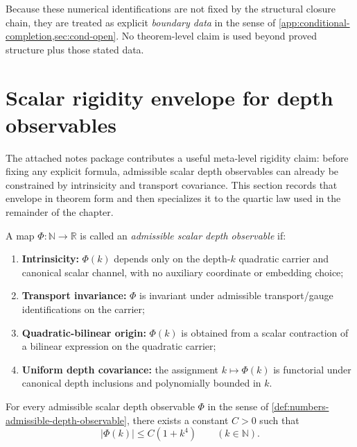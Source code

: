 Because these numerical identifications are not fixed by the structural
closure chain, they are treated as explicit \emph{boundary data} in the
sense of \cref{app:conditional-completion,sec:cond-open}.
No theorem-level claim is used beyond proved structure plus those stated
data.

\section{Scalar rigidity envelope for depth observables}
\label{sec:numbers-rigidity-envelope}

The attached notes package contributes a useful meta-level rigidity claim:
before fixing any explicit formula, admissible scalar depth observables
can already be constrained by intrinsicity and transport covariance.
This section records that envelope in theorem form and then specializes
it to the quartic law used in the remainder of the chapter.

\begin{definition}
\label{def:numbers-admissible-depth-observable}
A map \(\Phi:\mathbb N\to\mathbb R\) is called an
\emph{admissible scalar depth observable} if:
\begin{enumerate}[label=\textup{(\roman*)}]
\item
      \textbf{Intrinsicity:} \(\Phi(k)\) depends only on the depth-\(k\)
      quadratic carrier and canonical scalar channel, with no auxiliary
      coordinate or embedding choice;
\item
      \textbf{Transport invariance:} \(\Phi\) is invariant under admissible
      transport/gauge identifications on the carrier;
\item
      \textbf{Quadratic-bilinear origin:} \(\Phi(k)\) is obtained from a
      scalar contraction of a bilinear expression on the quadratic carrier;
\item
      \textbf{Uniform depth covariance:} the assignment
      \(k\mapsto\Phi(k)\) is functorial under canonical depth inclusions and
      polynomially bounded in \(k\).
\end{enumerate}
\end{definition}

\begin{proposition}
\label{prop:numbers-quartic-envelope}
For every admissible scalar depth observable
\(\Phi\) in the sense of
\cref{def:numbers-admissible-depth-observable}, there exists a
constant \(C>0\) such that
\[
  |\Phi(k)|\le C(1+k^4)
  \qquad (k\in\mathbb N).
\]
\end{proposition}

